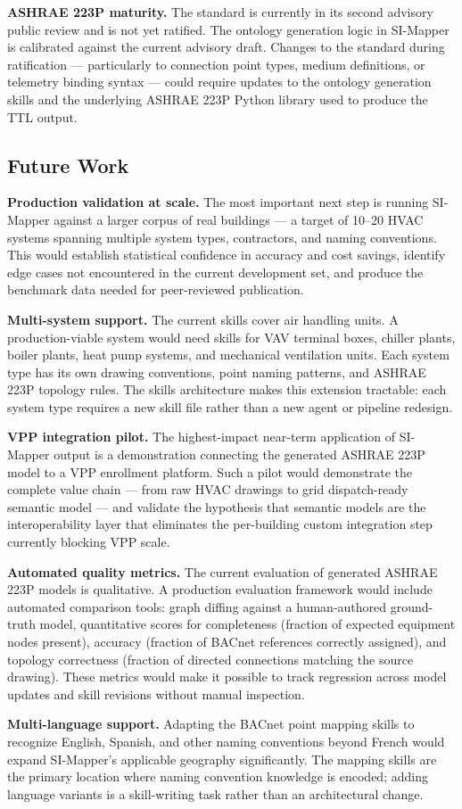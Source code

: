 \textbf{ASHRAE 223P maturity.}
The standard is currently in its second advisory public review and is not yet ratified.
The ontology generation logic in SI-Mapper is calibrated against the current advisory draft.
Changes to the standard during ratification --- particularly to connection point types, medium
definitions, or telemetry binding syntax --- could require updates to the ontology generation
skills and the underlying ASHRAE 223P Python library used to produce the TTL output.

\subsection{Future Work}
\label{subsec:future-work}

\textbf{Production validation at scale.}
The most important next step is running SI-Mapper against a larger corpus of real buildings ---
a target of 10--20 HVAC systems spanning multiple system types, contractors, and naming
conventions.
This would establish statistical confidence in accuracy and cost savings, identify edge cases
not encountered in the current development set, and produce the benchmark data needed for
peer-reviewed publication.

\textbf{Multi-system support.}
The current skills cover air handling units.
A production-viable system would need skills for VAV terminal boxes, chiller plants, boiler
plants, heat pump systems, and mechanical ventilation units.
Each system type has its own drawing conventions, point naming patterns, and ASHRAE 223P
topology rules.
The skills architecture makes this extension tractable: each system type requires a new
skill file rather than a new agent or pipeline redesign.

\textbf{VPP integration pilot.}
The highest-impact near-term application of SI-Mapper output is a demonstration connecting
the generated ASHRAE 223P model to a VPP enrollment platform.
Such a pilot would demonstrate the complete value chain --- from raw HVAC drawings to grid
dispatch-ready semantic model --- and validate the hypothesis that semantic models are the
interoperability layer that eliminates the per-building custom integration step currently
blocking VPP scale.

\textbf{Automated quality metrics.}
The current evaluation of generated ASHRAE 223P models is qualitative.
A production evaluation framework would include automated comparison tools: graph diffing
against a human-authored ground-truth model, quantitative scores for completeness (fraction
of expected equipment nodes present), accuracy (fraction of BACnet references correctly
assigned), and topology correctness (fraction of directed connections matching the source
drawing).
These metrics would make it possible to track regression across model updates and skill
revisions without manual inspection.

\textbf{Multi-language support.}
Adapting the BACnet point mapping skills to recognize English, Spanish, and other naming
conventions beyond French would expand SI-Mapper's applicable geography significantly.
The mapping skills are the primary location where naming convention knowledge is encoded;
adding language variants is a skill-writing task rather than an architectural change.
